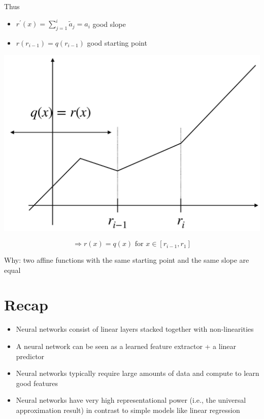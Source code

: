 \documentclass[10pt]{article}
\begin{document}
Thus

\begin{itemize}
  \item $r^{\prime}(x)=\sum_{j=1}^{i} \tilde{a}_{j}=a_{i}$ good slope
  \item $r\left(r_{i-1}\right)=q\left(r_{i-1}\right)$ good starting point
\end{itemize}

\begin{center}
\includegraphics[max width=\textwidth]{2024_01_08_0e0dcffe4bc8c6049046g-37}
\end{center}

$$
\Longrightarrow r(x)=q(x) \text { for } x \in\left[r_{i-1}, r_{1}\right]
$$

Why: two affine functions with the same starting point and the same slope are equal

\section*{Recap}
\begin{itemize}
  \item Neural networks consist of linear layers stacked together with non-linearities

  \item A neural network can be seen as a learned feature extractor + a linear predictor

  \item Neural networks typically require large amounts of data and compute to learn good features

  \item Neural networks have very high representational power (i.e., the universal approximation result) in contrast to simple models like linear regression

\end{itemize}
\end{document}
